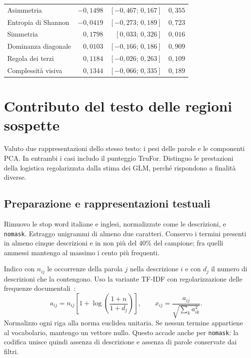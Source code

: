 \begin{table}[htbp]
\begin{tabular}{@{}lrrr@{}}
        Asimmetria & $-0{,}1498$ & $[-0{,}467;\,0{,}167]$ & $0{,}355$ \\
        Entropia di Shannon & $-0{,}0419$ & $[-0{,}273;\,0{,}189]$ & $0{,}723$ \\
        Simmetria & $0{,}1798$ & $[0{,}033;\,0{,}326]$ & $0{,}016$ \\
        Dominanza diagonale & $0{,}0103$ & $[-0{,}166;\,0{,}186]$ & $0{,}909$ \\
        Regola dei terzi & $0{,}1184$ & $[-0{,}026;\,0{,}263]$ & $0{,}109$ \\
        Complessità visiva & $0{,}1344$ & $[-0{,}066;\,0{,}335]$ & $0{,}189$ \\
        \bottomrule
    \end{tabular}
\end{table}

\section{Contributo del testo delle regioni sospette}
\label{sec:associazione-testo}

Valuto due rappresentazioni dello stesso testo: i pesi delle parole e le componenti PCA. In entrambi i casi includo il punteggio TruFor. Distinguo le prestazioni della logistica regolarizzata dalla stima dei GLM, perché rispondono a finalità diverse.

\subsection{Preparazione e rappresentazioni testuali}
\label{subsec:associazione-testo-preparazione}

Rimuovo le stop word italiane e inglesi, normalizzate come le descrizioni, e \texttt{nomask}. Estraggo unigrammi di almeno due caratteri. Conservo i termini presenti in almeno cinque descrizioni e in non più del $40\%$ del campione; fra quelli ammessi mantengo al massimo i cento più frequenti.

Indico con $n_{ij}$ le occorrenze della parola $j$ nella descrizione $i$ e con $d_j$ il numero di descrizioni che la contengono. Uso la variante TF-IDF con regolarizzazione delle frequenze documentali~\cite{scikit-learn}:
\begin{equation}
    a_{ij}=n_{ij}\left[1+\log\left(\frac{1+n}{1+d_j}\right)\right],
    \qquad x_{ij}=\frac{a_{ij}}{\sqrt{\sum_k a_{ik}^2}}.
    \label{eq:classificazione-tfidf}
\end{equation}
Normalizzo ogni riga alla norma euclidea unitaria. Se nessun termine appartiene al vocabolario, mantengo un vettore nullo. Questo accade anche per \texttt{nomask}: la codifica unisce quindi assenza di descrizione e assenza di parole conservate dai filtri.

